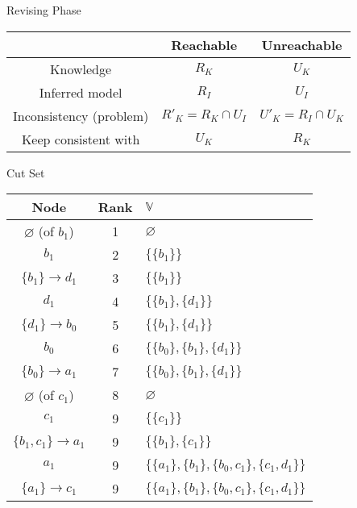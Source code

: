 \documentclass[8pt]{beamer}
\begin{document}
\begin{frame}{Revising Phase}
    \centering
    \begin{tabular}{c|c|c}
        &Reachable &Unreachable\\
        \hline
        Knowledge& $R_K$ & $U_K$ \pause\\
        \hline
        Inferred model& $R_I$ & $U_I$\pause\\
        \hline
        Inconsistency (problem)& $R'_K=R_K\cap U_I$ & $U'_K=R_I\cap U_K$\pause\\
        Keep consistent with& $U_K$& $R_K$ \pause\\
    \end{tabular}
\end{frame}

\begin{frame}{Cut Set}
    
    
\begin{tabular}{|c|c|l|}
 \hline 
 Node & Rank & $\mathbb{V}$ \\ 
 \hline 
 $\varnothing$ (of $b_1$) & 1 & $\varnothing$ \\ 
 \hline 
 $b_1$ & 2 & $\{\{b_1\}\}$ \pause\\ 
 \hline 
 $\{b_1\}\to d_1$ & 3 & $\{\{b_1\}\}$ \pause\\ 
 \hline 
 $d_1$ & 4 & $\{\{b_1\},\{d_1\}\}$ \\ 
 \hline 
 $\{d_1\}\to b_0$ & 5 & $\{\{b_1\},\{d_1\}\}$ \pause\\ 
 \hline 
 $b_0$ & 6 & $\{\{b_0\},\{b_1\},\{d_1\}\}$ \\ 
 \hline 
 $\{b_0\}\to a_1$ & 7 & $\{\{b_0\},\{b_1\},\{d_1\}\}$ \pause\\ 
 \hline 
 $\varnothing$ (of $c_1$) & 8 & $\varnothing$ \\ 
 \hline 
 $c_1$ & 9 & $\{\{c_1\}\}$ \pause\\ 
 \hline 
 $\{b_1,c_1\}\to a_1$ & 9 & $\{\{b_1\},\{c_1\}\}$ \pause\\ 
 \hline 
 $a_1$ & 9 & $\{\{a_1\},\{b_1\},\{b_0,c_1\},\{c_1,d_1\}\}$ \pause\\ 
 \hline 
 $\{a_1\}\to c_1$ & 9 & $\{\{a_1\},\{b_1\},\{b_0,c_1\},\{c_1,d_1\}\}$ \\ 
 \hline 
 \end{tabular}
\end{frame}
 
\end{document}
